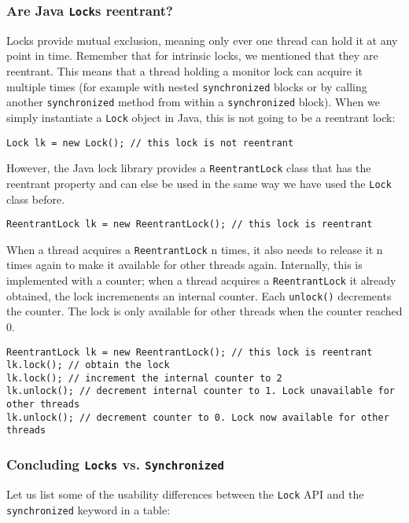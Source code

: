 \documentclass[main.tex]{subfiles}
\begin{document}
\subsubsection{Are Java \texttt{Lock}s reentrant?}
Locks provide mutual exclusion, meaning only ever one thread can hold it at any point in time. Remember that for intrinsic locks, we mentioned that they are reentrant. This means that a thread holding a monitor lock can acquire it multiple times (for example with nested \texttt{synchronized} blocks or by calling another \texttt{synchronized} method from within a \texttt{synchronized} block). When we simply instantiate a \texttt{Lock} object in Java, this is not going to be a reentrant lock:

\begin{verbatim}
Lock lk = new Lock(); // this lock is not reentrant
\end{verbatim}

\noindent However, the Java lock library provides a \texttt{ReentrantLock} class that has the reentrant property and can else be used in the same way we have used the \texttt{Lock} class before.

\begin{verbatim}
ReentrantLock lk = new ReentrantLock(); // this lock is reentrant
\end{verbatim}

When a thread acquires a \texttt{ReentrantLock} n times, it also needs to release it n times again to make it available for other threads again. Internally, this is implemented with a counter; when a thread acquires a \texttt{ReentrantLock} it already obtained, the lock incremenents an internal counter. Each \texttt{unlock()} decrements the counter. The lock is only available for other threads when the counter reached 0.

\begin{verbatim}
ReentrantLock lk = new ReentrantLock(); // this lock is reentrant
lk.lock(); // obtain the lock
lk.lock(); // increment the internal counter to 2
lk.unlock(); // decrement internal counter to 1. Lock unavailable for other threads
lk.unlock(); // decrement counter to 0. Lock now available for other threads
\end{verbatim}

\subsubsection{Concluding \texttt{Locks} vs. \texttt{Synchronized}}
Let us list some of the usability differences between the \texttt{Lock} API and the \texttt{synchronized} keyword in a table:\\
\end{document}
